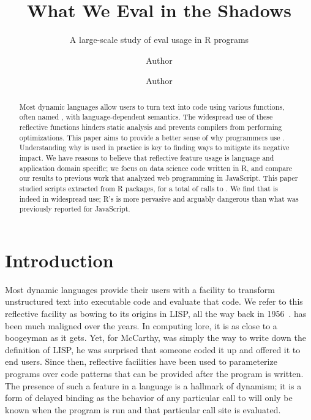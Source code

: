 \documentclass[review,nonacm,screen,acmsmall,anonymous=true]{acmart}
\begin{document}
\title{What We Eval in the Shadows}
\subtitle{A large-scale study of {\sf eval} usage in R programs}

\author{Author }
\orcid{}\author{Author}\authornotemark[1]

\begin{abstract}
  \noindent Most dynamic languages allow users to turn text into code using
  various functions, often named \eval, with language-dependent semantics. The
  widespread use of these reflective functions hinders static analysis and
  prevents compilers from performing optimizations. This paper aims to provide a
  better sense of why programmers use \eval. Understanding why \eval is used in
  practice is key to finding ways to mitigate its negative impact. We have
  reasons to believe that reflective feature usage is language and application
  domain specific; we focus on data science code written in R, and compare our
  results to previous work that analyzed web programming in JavaScript. This
  paper studied \CranRunnableScripts scripts extracted from \CranPackages R
  packages, for a total of \packageAllcalls calls to \eval. We find that \eval
  is indeed in widespread use; R's \eval is more pervasive and arguably
  dangerous than what was previously reported for JavaScript.
\end{abstract}

\maketitle

\section{Introduction}

Most dynamic languages provide their users with a facility to
transform unstructured text into executable code and evaluate that
code. We refer to this reflective facility as \eval bowing to its
origins in LISP, all the way back in 1956~\cite{lisp}. \Eval has been
much maligned over the years. In computing lore, it is as close to a
boogeyman as it gets. Yet, for McCarthy, \eval was simply the way to
write down the definition of LISP, he was surprised that someone coded
it up and offered it to end users. Since then, reflective facilities
have been used to parameterize programs over code patterns that can be
provided after the program is written. The presence of such a feature
in a language is a hallmark of dynamism; it is a form of delayed
binding as the behavior of any particular call to \eval will only be
known when the program is run and that particular call site is
evaluated.
\end{document}

